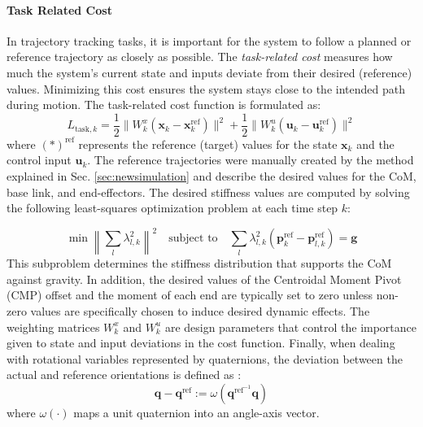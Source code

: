 \documentclass[main.tex]{subfiles}
\begin{document}
\begin{sloppypar}
\paragraph{Task Related Cost}
In trajectory tracking tasks, it is important for the system to follow a planned or reference trajectory as closely as possible. The \textit{task-related cost} measures how much the system's current state and inputs deviate from their desired (reference) values. Minimizing this cost ensures the system stays close to the intended path during motion. The task-related cost function is formulated as:
\begin{equation}
L_{\text{task},k} = \frac{1}{2} \| W^x_k (\mathbf{x}_k - \mathbf{x}^{\text{ref}}_k) \|^2 + \frac{1}{2} \| W^u_k (\mathbf{u}_k - \mathbf{u}^{\text{ref}}_k) \|^2
\end{equation}
where $(\ast)^{\text{ref}}$ represents the reference (target) values for the state $\mathbf{x}_k$ and the control input $\mathbf{u}_k$. The reference trajectories were manually created by the method explained in Sec. \ref{sec:newsimulation} and describe the desired values for the CoM, base link, and end-effectors. The desired stiffness values are computed by solving the following least-squares optimization problem at each time step $k$:

\begin{equation}
\min \left\| \sum_l \lambda_{l,k}^2 \right\|^2 \quad \text{subject to} \quad \sum_l \lambda_{l,k}^2 (\mathbf{p}^{\text{ref}}_k - \mathbf{p}^{\text{ref}}_{l,k}) = \mathbf{g}
\end{equation}
This subproblem determines the stiffness distribution that supports the CoM against gravity. In addition, the desired values of the Centroidal Moment Pivot (CMP) offset and the moment of each end are typically set to zero unless non-zero values are specifically chosen to induce desired dynamic effects. The weighting matrices $W^x_k$ and $W^u_k$ are design parameters that control the importance given to state and input deviations in the cost function. Finally, when dealing with rotational variables represented by quaternions, the deviation between the actual and reference orientations is defined as :
\begin{equation}
\mathbf{q} - \mathbf{q}^{\text{ref}} := \omega(\mathbf{q}^{\text{ref}^{-1}} \mathbf{q})
\end{equation}
where $\omega(\cdot)$ maps a unit quaternion into an angle-axis vector.

\end{sloppypar}
\end{document}

